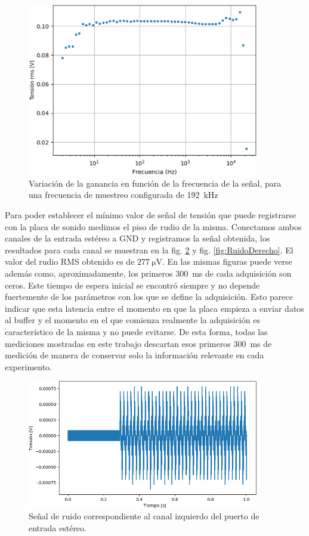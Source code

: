 \documentclass[a4paper,11pt]{article}
\begin{document}
	\begin{figure}[!h]
		\centering
		\includegraphics[width=0.9\textwidth]{imagenes/bode192kHz.png}
		\caption{Variación de la ganancia en función de la frecuencia de
la señal, para una frecuencia de muestreo configurada de \SI{192}{\kHz}}
        \label{fig:bode192k}
	\end{figure}

Para poder establecer el mínimo valor de señal de tensión que puede
registrarse con la placa de sonido medimos el piso de rudio de la misma.
Conectamos ambos canales de la entrada estéreo a GND y registramos la
señal obtenida, los resultados para cada canal se muestran en la
fig. \ref{fig:RuidoIzquierdo} y fig. \ref{fig:RuidoDerecho}.
El valor del rudio RMS obtenido es de $\SI{277}{\uV}$. En las mismas figuras puede verse además como, aproximadamente, los primeros \SI{300}{\milli\second} de cada adquisición son ceros. Este tiempo de espera inicial se encontró siempre y no depende fuertemente de los parámetros con los que se define la adquisición. Esto parece indicar que esta latencia entre el momento en que la placa empieza a enviar datos al buffer y el momento en el que comienza realmente la adquisición es característico de la misma y no puede evitarse. De esta forma, todas las mediciones mostradas en este trabajo descartan esos primeros \SI{300}{\milli\second} de medición de manera de conservar solo la información relevante en cada experimento.  

	\begin{figure}[h]
		\centering
		\includegraphics[width=0.9\textwidth]{imagenes/RuidoCanalIzquierdo.png}
		\caption{Señal de ruido correspondiente al canal izquierdo del
puerto de entrada estéreo.}
        \label{fig:RuidoIzquierdo}
	\end{figure}
	
\end{document}
